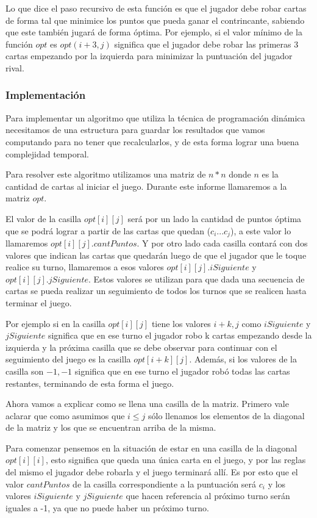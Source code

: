 Lo que dice el paso recursivo de esta función es que el jugador debe robar cartas de forma tal que minimice los puntos que pueda ganar el contrincante, sabiendo que este también jugará de forma óptima. Por ejemplo, si el valor mínimo de la función $opt$ es $opt(i+3,j)$ significa que el jugador debe robar las primeras 3 cartas empezando por la izquierda para minimizar la puntuación del jugador rival.

\subsubsection{Implementación}

Para implementar un algoritmo que utiliza la técnica de programación dinámica necesitamos de una estructura para guardar los resultados que vamos computando para no tener que recalcularlos, y de esta forma lograr una buena complejidad temporal.

Para resolver este algoritmo utilizamos una matriz de $n * n$ donde $n$ es la cantidad de cartas al iniciar el juego. Durante este informe llamaremos a la matriz $opt$.

El valor de la casilla $opt[i][j]$ será por un lado la cantidad de puntos óptima que se podrá lograr a partir de las cartas que quedan ($c_i ... c_j$), a este valor lo llamaremos $opt[i][j].cantPuntos$. Y por otro lado cada casilla contará con dos valores que indican las cartas que quedarán luego de que el jugador que le toque realice su turno, llamaremos a esos valores $opt[i][j].iSiguiente$ y $opt[i][j].jSiguiente$. Estos valores se utilizan para que dada una secuencia de cartas se pueda realizar un seguimiento de todos los turnos que se realicen hasta terminar el juego.

Por ejemplo si en la casilla $opt[i][j]$ tiene los valores $i+k, j$ como $iSiguiente$ y $jSiguiente$ significa que en ese turno el jugador robo k cartas empezando desde la izquierda y la próxima casilla que se debe observar para continuar con el seguimiento del juego es la casilla $opt[i+k][j]$. Además, si los valores de la casilla son $-1, -1$ significa que en ese turno el jugador robó todas las cartas restantes, terminando de esta forma el juego.

Ahora vamos a explicar como se llena una casilla de la matriz. Primero vale aclarar que como asumimos que $i \leq j$ sólo llenamos los elementos de la diagonal de la matriz y los que se encuentran arriba de la misma.

Para comenzar pensemos en la situación de estar en una casilla de la diagonal $opt[i][i]$, esto significa que queda una única carta en el juego, y por las reglas del mismo el jugador debe robarla y el juego terminará allí. Es por esto que el valor $cantPuntos$ de la casilla correspondiente a la puntuación será $c_i$ y los valores $iSiguiente$ y $jSiguiente$ que hacen referencia al próximo turno serán iguales a -1, ya que no puede haber un próximo turno.

